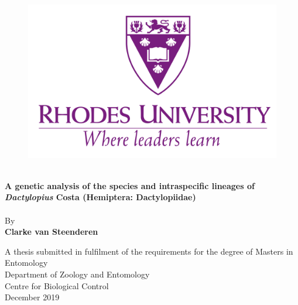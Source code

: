 \documentclass[12pt]{report}
\begin{document}

\doublespacing

\begin{titlepage}


\begin{figure}[h]
    \centering
    \includegraphics[scale = 0.2]{Images/Rhodes_logo.png}
    
\end{figure}

{\centering
{\Huge
\hrulefill \\
\textbf{A genetic analysis of the species and intraspecific lineages of \textit{Dactylopius} Costa (Hemiptera: Dactylopiidae)}\\
\hrulefill \\
\vspace{0.5cm}
{\large By}\\
{\Large \textbf{Clarke van Steenderen}}\\
\vspace{1cm}}

{\vspace{0.5cm}}
{\Large A thesis submitted in fulfilment of the requirements for the degree of Masters in Entomology} \\

\vspace{0.5cm}
{\large Department of Zoology and Entomology} \\
{\large Centre for Biological Control} \\
\vspace{0.5cm}
{\large December 2019} \\
}

\end{titlepage}
\end{document}
